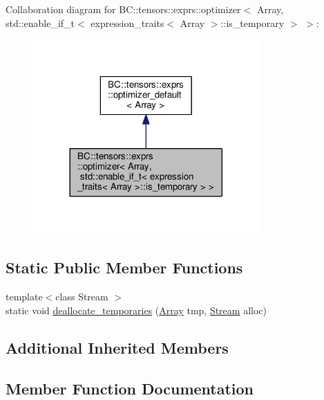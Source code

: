 Collaboration diagram for BC\+:\+:tensors\+:\+:exprs\+:\+:optimizer$<$ Array, std\+:\+:enable\+\_\+if\+\_\+t$<$ expression\+\_\+traits$<$ Array $>$\+:\+:is\+\_\+temporary $>$ $>$\+:
\nopagebreak
\begin{figure}[H]
\begin{center}
\leavevmode
\includegraphics[width=245pt]{structBC_1_1tensors_1_1exprs_1_1optimizer_3_01Array_00_01std_1_1enable__if__t_3_01expression__tre0c215719d3b7d203a4248765bdabd0d}
\end{center}
\end{figure}
\subsection*{Static Public Member Functions}
\begin{DoxyCompactItemize}
\item 
{\footnotesize template$<$class Stream $>$ }\\static void \hyperlink{structBC_1_1tensors_1_1exprs_1_1optimizer_3_01Array_00_01std_1_1enable__if__t_3_01expression__tr68cef5038e1d1eb9ba9ce04475b4c24a_a1d462693bd0daccefc7e16f100b16545}{deallocate\+\_\+temporaries} (\hyperlink{classBC_1_1tensors_1_1exprs_1_1Array}{Array} tmp, \hyperlink{namespaceBC_abc64a63cd29a22d102a68f478dfd588d}{Stream} alloc)
\end{DoxyCompactItemize}
\subsection*{Additional Inherited Members}


\subsection{Member Function Documentation}
